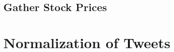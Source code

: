 


\lipsum[1]

\subsection{Gather Stock Prices}
\label{ss:casestudy-gatherdata-stockprices}



\lipsum[1]

\section{Normalization of Tweets}
\label{s:casestudy-normalization}


